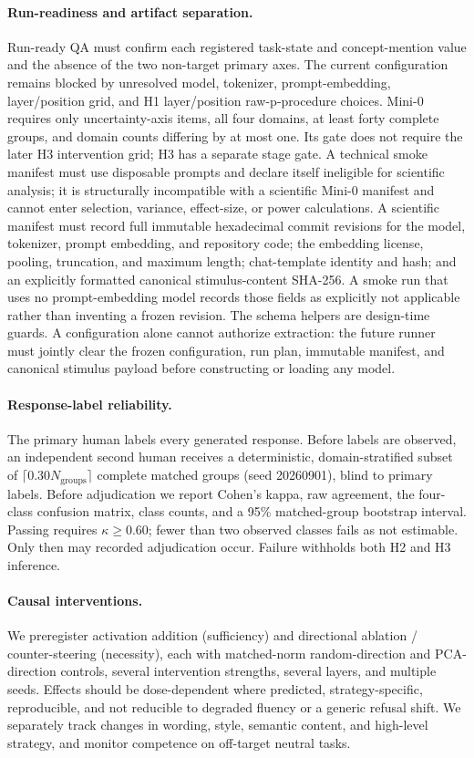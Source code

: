 \documentclass[11pt]{article}
\begin{document}
\paragraph{Run-readiness and artifact separation.}
Run-ready QA must confirm each registered task-state and concept-mention value and
the absence of the two non-target primary axes. The current configuration remains
blocked by unresolved model, tokenizer, prompt-embedding, layer/position grid, and
H1 layer/position raw-p-procedure choices. Mini-0 requires only uncertainty-axis
items, all four domains, at least forty complete groups, and domain counts differing
by at most one. Its gate does not require the later H3 intervention grid; H3 has a
separate stage gate.
A technical smoke manifest must use disposable prompts and declare itself
ineligible for scientific analysis; it is structurally incompatible with a
scientific Mini-0 manifest and cannot enter selection, variance, effect-size, or
power calculations. A scientific manifest must record full immutable hexadecimal
commit revisions for the model, tokenizer, prompt embedding, and repository code;
the embedding license, pooling, truncation, and maximum length; chat-template
identity and hash; and an explicitly formatted canonical stimulus-content SHA-256.
A smoke run that uses no
prompt-embedding model records those fields as explicitly not applicable rather
than inventing a frozen revision. The schema helpers are design-time guards. A
configuration alone cannot authorize extraction: the future runner must jointly
clear the frozen configuration, run plan, immutable manifest, and canonical
stimulus payload before constructing or loading any model.

\paragraph{Response-label reliability.}
The primary human labels every generated response. Before labels are observed, an
independent second human receives a deterministic, domain-stratified subset of
$\lceil0.30N_{\mathrm{groups}}\rceil$ complete matched groups (seed 20260901), blind
to primary labels. Before adjudication we report Cohen's kappa, raw agreement, the
four-class confusion matrix, class counts, and a 95\% matched-group bootstrap
interval. Passing requires $\kappa\geq0.60$; fewer than two observed classes fails
as not estimable. Only then may recorded adjudication occur. Failure withholds both
H2 and H3 inference.

\paragraph{Causal interventions.}
We preregister activation addition (sufficiency) and directional ablation /
counter-steering (necessity), each with matched-norm random-direction and
PCA-direction controls, several intervention strengths, several layers, and
multiple seeds. Effects should be dose-dependent where predicted, strategy-specific,
reproducible, and not reducible to degraded fluency or a generic refusal shift. We
separately track changes in wording, style, semantic content, and high-level
strategy, and monitor competence on off-target neutral tasks.
\end{document}
